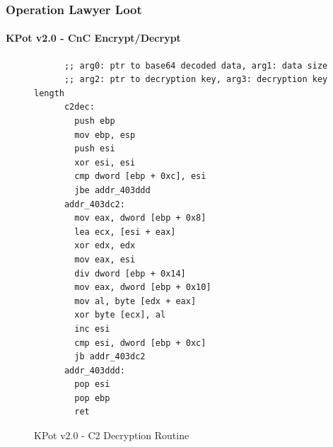 \documentclass[aspectratio=169]{beamer}
\begin{document}
{
  \begin{frame}[fragile]{}
    \frametitle{Operation Lawyer Loot}
    \framesubtitle{KPot v2.0 - CnC Encrypt/Decrypt}
    \begin{figure}[hp]
      \begin{tcolorbox}[title=KPot v2.0 - CnC Encrypt/Decrypt Routine,colback=black]
     \begin{verbatim}
      ;; arg0: ptr to base64 decoded data, arg1: data size
      ;; arg2: ptr to decryption key, arg3: decryption key length
      c2dec:
        push ebp
        mov ebp, esp
        push esi
        xor esi, esi
        cmp dword [ebp + 0xc], esi
        jbe addr_403ddd
      addr_403dc2:
        mov eax, dword [ebp + 0x8]
        lea ecx, [esi + eax]
        xor edx, edx
        mov eax, esi
        div dword [ebp + 0x14]
        mov eax, dword [ebp + 0x10]
        mov al, byte [edx + eax]
        xor byte [ecx], al
        inc esi
        cmp esi, dword [ebp + 0xc]
        jb addr_403dc2
      addr_403ddd:
        pop esi
        pop ebp
        ret
    \end{verbatim}
  \end{tcolorbox}
  \caption{KPot v2.0 - C2 Decryption Routine}
\end{figure}
\end{frame}
}
\end{document}
